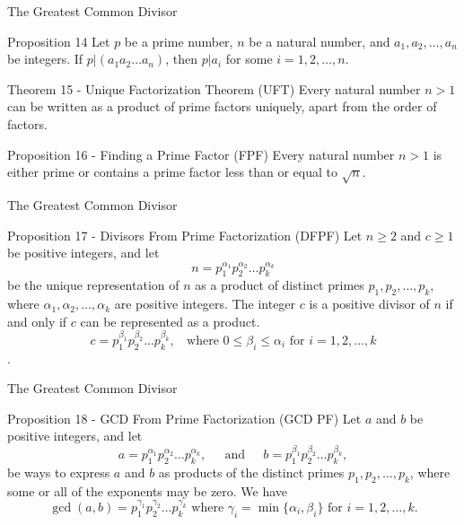 \documentclass[11pt, aspectratio=169]{beamer}
\begin{document}
\begin{frame}{The Greatest Common Divisor}

\begin{block}{Proposition 14}
Let $p$ be a prime number, $n$ be a natural number, and $a_1, a_2, \dots, a_n$ be integers. If $p | (a_1a_2 \dots a_n)$, then $p | a_i$ for some $i = 1,2,\dots, n$.
\end{block}

\begin{block}{Theorem 15 - Unique Factorization Theorem (UFT)}
Every natural number $n > 1$ can be written as a product of prime factors uniquely, apart
from the order of factors.
\end{block}

\begin{block}{Proposition 16 - Finding a Prime Factor (FPF)}
Every natural number $n > 1$ is either prime or contains a prime factor less than or equal
to $\sqrt{n}$.
\end{block}
\end{frame}



\begin{frame}{The Greatest Common Divisor}

\begin{block}{Proposition 17 - Divisors From Prime Factorization (DFPF)}
Let $n \ge 2$ and $c \ge 1$ be positive integers, and let $$n = p_1^{\alpha_1}p_2^{\alpha_2} \dots p_k^{\alpha_k}$$
be the unique representation of $n$ as a product of distinct primes $p_1, p_2, \dots, p_k$, where $\alpha_1, \alpha_2, \dots, \alpha_k$ are positive integers. The integer $c$ is a positive divisor of $n$ if and only if $c$ can be represented as a product. $$c = p_1^{\beta_1}p_2^{\beta_2} \dots p_k^{\beta_k}, \; \; \text{ where } 0 \le \beta_i \le \alpha_i \text{ for } i = 1, 2, \dots, k$$.
\end{block}
\end{frame}

\begin{frame}{The Greatest Common Divisor}

\begin{block}{Proposition 18 - GCD From Prime Factorization (GCD PF)}
Let $a$ and $b$ be positive integers, and let
$$a = p_1^{\alpha_1}p_2^{\alpha_2} \dots p_k^{\alpha_k}, \; \; \; \; \text{ and } \; \; \; \; b = p_1^{\beta_1}p_2^{\beta_2} \dots p_k^{\beta_k}, $$
be ways to express $a$ and $b$ as products of the distinct primes $p_1, p_2, \dots, p_k$, where some or all of the exponents may be zero. We have
$$\gcd(a,b) = p_1^{\gamma_1}p_2^{\gamma_2}\dots p_k^{\gamma_k} \text{ where } \gamma_i = \min\{\alpha_i, \beta_i\} \text{ for } i = 1,2, \dots, k.$$
\end{block}

\end{frame}
\end{document}
